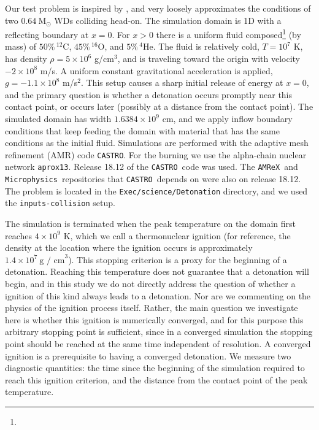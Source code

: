 \documentclass[twocolumn,numberedappendix,trackchanges]{../aastex62}
\newcommand{\msolar}{\mathrm{M}_\odot}
\newcommand{\amrex}{\texttt{AMReX}}
\newcommand{\castro}{\texttt{CASTRO}}
\newcommand{\microphysics}{\texttt{Microphysics}}
\begin{document}
Our test problem is inspired by \cite{kushnir:2013}, and very loosely approximates the
conditions of two $0.64\ \msolar$ WDs colliding head-on. The simulation domain is 1D with a
reflecting boundary at $x = 0$. For $x > 0$ there is a uniform fluid composed\footnote{
} (by mass)
of $50\%\, ^{12}$C, $45\%\, ^{16}$O, and $5\%\, ^{4}$He.   The fluid is relatively cold,
$T = 10^7$ K, has density $\rho = 5 \times 10^6$ g/cm$^3$, and is traveling toward the
origin with velocity $-2 \times 10^8$ m/s. A uniform constant gravitational acceleration
is applied, $g = -1.1 \times 10^8$ m/s$^{2}$. This setup causes a sharp initial release
of energy at $x = 0$, and the primary question is whether a detonation occurs promptly
near this contact point, or occurs later (possibly at a distance from the contact point).
The simulated domain has width $1.6384 \times 10^9$ cm, and we apply inflow boundary conditions
that keep feeding the domain with material that has the same conditions as the initial fluid.
Simulations are performed with the adaptive mesh refinement (AMR) code \castro.
For the burning we use the alpha-chain nuclear network \texttt{aprox13}.
Release 18.12 of the \castro\ code was used. The \amrex\ and \microphysics\ repositories
that \castro\ depends on were also on release 18.12. The problem is located in the
\texttt{Exec/science/Detonation} directory, and we used the \texttt{inputs-collision} setup.

The simulation is terminated when the peak temperature on the domain first reaches
$4 \times 10^9$ K, which we call a thermonuclear ignition (for reference, the
density at the location where the ignition occurs is approximately $1.4\times 10^7\ \text{g / cm}^3$). This stopping criterion is a
proxy for the beginning of a detonation. Reaching this temperature does not guarantee
that a detonation will begin, and in this study we do not directly address the question
of whether a ignition of this kind always leads to a detonation. Nor are we commenting
on the physics of the ignition process itself. Rather, the main question
we investigate here is whether this ignition is numerically converged, and for this purpose
this arbitrary stopping point is sufficient, since in a converged simulation the stopping point
should be reached at the same time independent of resolution. A converged ignition
is a prerequisite to having a converged detonation. We measure two diagnostic quantities:
the time since the beginning of the simulation required to reach this ignition criterion,
and the distance from the contact point of the peak temperature.
\end{document}
